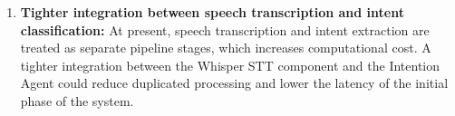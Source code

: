 \begin{enumerate}
  \item \textbf{Tighter integration between speech transcription and intent classification:} At present, speech transcription and intent extraction are treated as separate pipeline stages, which increases computational cost. A tighter integration between the Whisper STT component and the Intention Agent could reduce duplicated processing and lower the latency of the initial phase of the system.

\end{enumerate}
